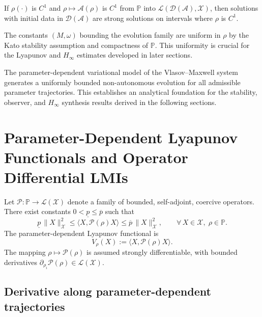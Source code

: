 \documentclass[AMA,Times2COL]{WileyNJDv5}
\begin{document}
\begin{remark}
If $\rho(\cdot)$ is $C^1$ and
$\rho\mapsto\mathcal A(\rho)$ is $C^1$ from $\mathbb P$ into $\mathcal L(\mathcal D(\mathcal A),\mathscr X)$, then solutions with initial data in $\mathcal D(\mathcal A)$ are strong solutions on intervals where $\rho$ is $C^1$.
\end{remark}

\begin{remark}
The constants $(M,\omega)$ bounding the evolution family are uniform in $\rho$ by the Kato stability assumption and compactness of $\mathbb P$.
This uniformity is crucial for the Lyapunov and $H_\infty$ estimates developed in later sections.
\end{remark}

The parameter-dependent variational model of the Vlasov--Maxwell system generates a uniformly bounded non-autonomous evolution for all admissible parameter trajectories.
This establishes an analytical foundation for the stability, observer, and $H_\infty$ synthesis results derived in the following sections.

\section{Parameter-Dependent Lyapunov Functionals and Operator Differential LMIs}
\label{sec:lyapunov}

Let $\mathcal{P}:\mathbb{P}\to\mathcal{L}(\mathscr{X})$ denote a family of bounded, self-adjoint, coercive operators.  
There exist constants $0<\underline{p}\le \overline{p}$ such that
\begin{equation}\label{eq:P-bounds}
\underline{p}\,\|X\|_{\mathscr{X}}^{2}
\le
\langle X,\mathcal{P}(\rho)X\rangle
\le
\overline{p}\,\|X\|_{\mathscr{X}}^{2},
\qquad
\forall\,X\in\mathscr{X},\;\rho\in\mathbb{P}.
\end{equation}
The parameter-dependent Lyapunov functional is
\begin{equation}\label{eq:Lyap-func}
V_\rho(X) := \langle X,\mathcal{P}(\rho)X\rangle .
\end{equation}
The mapping $\rho\mapsto\mathcal{P}(\rho)$ is assumed strongly differentiable, with bounded derivatives
$\partial_{\rho_i}\mathcal{P}(\rho)\in\mathcal{L}(\mathscr{X})$.

\subsection{Derivative along parameter-dependent trajectories}
\end{document}
